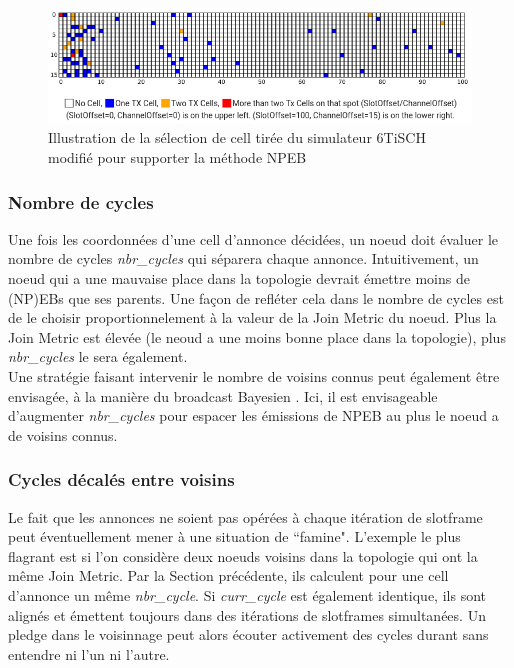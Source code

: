 \documentclass[]{report}
\begin{document}
\newpage

 \vspace{1cm}
	\begin{figure}[!h]
	\centering
	\includegraphics[width=0.95\linewidth]{NPEB_cell}
	\caption{Illustration de la sélection de cell tirée du simulateur 6TiSCH \cite{simulating-6TiSCH} modifié pour supporter la méthode NPEB}
	\label{fig:NPEB_cells}
	\end{figure}

\vspace{0.6cm}

\subsubsection{Nombre de cycles}

Une fois les coordonnées d'une cell d'annonce décidées, un noeud doit évaluer le nombre de cycles \textit{nbr\_cycles} qui séparera chaque annonce. Intuitivement, un noeud qui a une mauvaise place dans la topologie devrait émettre moins de (NP)EBs que ses parents. Une façon de refléter cela dans le nombre de cycles est de le choisir proportionnelement à la valeur de la Join Metric du noeud. Plus la Join Metric est élevée (le neoud a une moins bonne place dans la topologie), plus \textit{nbr\_cycles} le sera également.\\

Une stratégie faisant intervenir le nombre de voisins connus peut également être envisagée, à la manière du broadcast Bayesien \cite{broadcast-strategies}. Ici, il est envisageable d'augmenter \textit{nbr\_cycles} pour espacer les émissions de NPEB au plus le noeud a de voisins connus.
~\\
\subsubsection{Cycles décalés entre voisins}

Le fait que les annonces ne soient pas opérées à chaque itération de slotframe peut éventuellement mener à une situation de ``famine". L'exemple le plus flagrant est si l'on considère deux noeuds voisins dans la topologie qui ont la même Join Metric. Par la Section précédente, ils calculent pour une cell d'annonce un même \textit{nbr\_cycle}. Si \textit{curr\_cycle} est également identique, ils sont alignés et émettent toujours dans des itérations de slotframes simultanées. Un pledge dans le voisinnage peut alors écouter activement des cycles durant sans entendre ni l'un ni l'autre.\\
\end{document}
